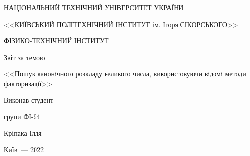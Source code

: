 
	\thispagestyle{empty}
	
	\begin{center}
		НАЦІОНАЛЬНИЙ ТЕХНІЧНИЙ УНІВЕРСИТЕТ УКРАЇНИ \par
		<<КИЇВСЬКИЙ ПОЛІТЕХНІЧНИЙ ІНСТИТУТ ім. Ігоря СІКОРСЬКОГО>>\par
		ФІЗИКО-ТЕХНІЧНИЙ ІНСТИТУТ\par
		
		\vspace{60mm}
		{\huge Звіт за темою\par
			\LARGE <<Пошук канонiчного розкладу великого числа,
використовуючи вiдомi методи факторизацiї>>\par}
		
	\end{center}
	
	\vspace{40mm}
	\begin{flushright}
		Виконав студент
		
		групи ФІ-94
		
		Кріпака Ілля
		
	\end{flushright}
	
	\vspace{40mm}
	\begin{center}
		{Київ~--- 2022}
	\end{center}
	